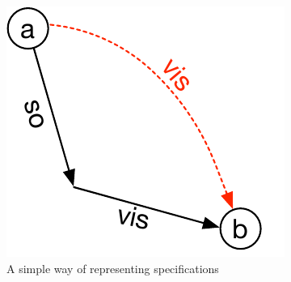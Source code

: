 \begin{figure}[h]
\includegraphics[scale=0.6]{../Figures/MR.pdf}
\caption{A simple way of representing specifications}
\label{fig:ctrt}
\end{figure}

